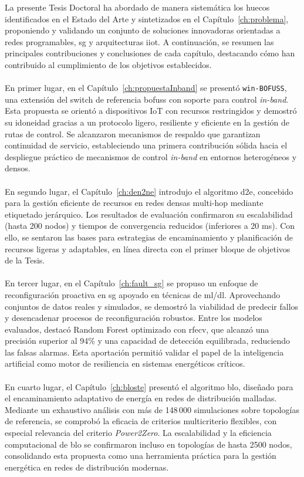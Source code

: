 La presente Tesis Doctoral ha abordado de manera sistemática los huecos identificados en el Estado del Arte y sintetizados en el Capítulo~\ref{ch:problema}, proponiendo y validando un conjunto de soluciones innovadoras orientadas a redes programables, \gls{sg} y arquitecturas \gls{iiot}. A continuación, se resumen las principales contribuciones y conclusiones de cada capítulo, destacando cómo han contribuido al cumplimiento de los objetivos establecidos.\\
\\
En primer lugar, en el Capítulo~\ref{ch:propuestaInband} se presentó \texttt{win-BOFUSS}, una extensión del switch de referencia \gls{bofuss} con soporte para control \textit{in-band}. Esta propuesta se orientó a dispositivos IoT con recursos restringidos y demostró su idoneidad gracias a un protocolo ligero, resiliente y eficiente en la gestión de rutas de control. Se alcanzaron mecanismos de respaldo que garantizan continuidad de servicio, estableciendo una primera contribución sólida hacia el despliegue práctico de mecanismos de control \textit{in-band} en entornos heterogéneos y densos.\\
\\
En segundo lugar, el Capítulo~\ref{ch:den2ne} introdujo el algoritmo \gls{d2e}, concebido para la gestión eficiente de recursos en redes densas multi-hop mediante etiquetado jerárquico. Los resultados de evaluación confirmaron su escalabilidad (hasta 200 nodos) y tiempos de convergencia reducidos (inferiores a 20 ms). Con ello, se sentaron las bases para estrategias de encaminamiento y planificación de recursos ligeras y adaptables, en línea directa con el primer bloque de objetivos de la Tesis.\\
\\
En tercer lugar, en el Capítulo~\ref{ch:fault_sg} se propuso un enfoque de reconfiguración proactiva en \gls{sg} apoyado en técnicas de \gls{ml}/\gls{dl}. Aprovechando conjuntos de datos reales y simulados, se demostró la viabilidad de predecir fallos y desencadenar procesos de reconfiguración robustos. Entre los modelos evaluados, destacó Random Forest optimizado con \gls{rfecv}, que alcanzó una precisión superior al 94\% y una capacidad de detección equilibrada, reduciendo las falsas alarmas. Esta aportación permitió validar el papel de la inteligencia artificial como motor de resiliencia en sistemas energéticos críticos.\\
\\
En cuarto lugar, el Capítulo~\ref{ch:bloste} presentó el algoritmo \gls{blo}, diseñado para el encaminamiento adaptativo de energía en redes de distribución malladas. Mediante un exhaustivo análisis con más de 148\,000 simulaciones sobre topologías de referencia, se comprobó la eficacia de criterios multicriterio flexibles, con especial relevancia del criterio \textit{Power2Zero}. La escalabilidad y la eficiencia computacional de \gls{blo} se confirmaron incluso en topologías de hasta 2500 nodos, consolidando esta propuesta como una herramienta práctica para la gestión energética en redes de distribución modernas.\\
